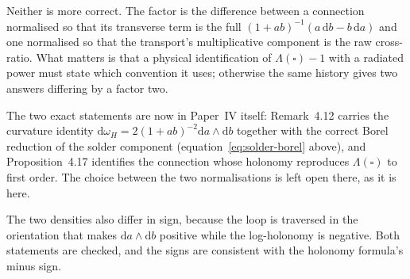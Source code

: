 \begin{remark}
Neither is more correct.  The factor is the difference between a connection
normalised so that its transverse term is the full $(1+ab)^{-1}(a\,\mathrm
db-b\,\mathrm da)$ and one normalised so that the transport's multiplicative
component is the raw cross-ratio.  What matters is that a physical
identification of $\Lambda(\square)-1$ with a radiated power must state which
convention it uses; otherwise the same history gives two answers differing by a
factor two.

The two exact statements are now in Paper~IV itself: Remark~4.12 carries the
curvature identity $\mathrm d\omega_H=2(1+ab)^{-2}\mathrm da\wedge\mathrm db$
together with the correct Borel reduction of the solder component
(equation~\eqref{eq:solder-borel} above), and Proposition~4.17 identifies the
connection whose holonomy reproduces $\Lambda(\square)$ to first order.  The
choice between the two normalisations is left open there, as it is here.
\end{remark}

\begin{remark}[Sign]
\label{rem:sign}
The two densities also differ in sign, because the loop is traversed in the
orientation that makes $\mathrm da\wedge\mathrm db$ positive while the
log-holonomy is negative.  Both statements are checked, and the signs are
consistent with the holonomy formula's minus sign.
\end{remark}
